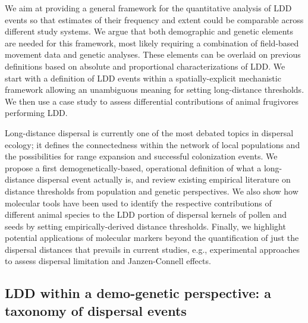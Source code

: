 \documentclass[a4paper, 12pt]{article}
\begin{document}
\begin{linenumbers}
We aim at providing a general framework for the quantitative analysis of LDD events so that estimates of their frequency and extent could be comparable across different study systems. We argue that both demographic and genetic elements are needed for this framework, most likely requiring a combination of field-based movement data and genetic analyses. These elements can be overlaid on previous definitions based on absolute and proportional characterizations of LDD. We start with a definition of LDD events within a spatially-explicit mechanistic framework allowing an unambiguous meaning for setting long-distance thresholds. We then use a case study to assess differential contributions of animal frugivores performing LDD.

Long-distance dispersal is currently one of the most debated topics in dispersal ecology; it defines the connectedness within the network of local populations and the possibilities for range expansion and successful colonization events. We propose a first demogenetically-based, operational definition of what a long-distance dispersal event actually is, and review existing empirical literature on distance thresholds from population and genetic perspectives. We also show how molecular tools have been used to identify the respective contributions of different animal species to the LDD portion of dispersal kernels of pollen and seeds by setting empirically-derived distance thresholds. Finally, we highlight potential applications of molecular markers beyond the quantification of just the dispersal distances that prevails in current studies, e.g., experimental approaches to assess dispersal limitation and Janzen-Connell effects.


\subsection*{LDD within a demo-genetic perspective: a taxonomy of dispersal events}


\end{linenumbers}
\end{document}
